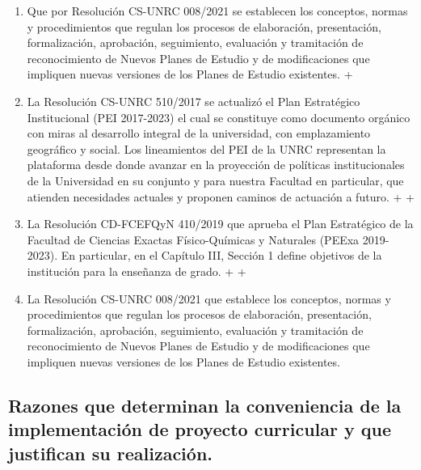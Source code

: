 \begin{enumerate}
- \item Que por Resolución CS-UNRC 008/2021 se establecen los conceptos, normas y procedimientos que regulan los procesos de elaboración, presentación, formalización, aprobación, seguimiento, evaluación y tramitación de reconocimiento de Nuevos Planes de Estudio y de modificaciones que impliquen nuevas versiones de los Planes de Estudio existentes.
+\item La Resolución CS-UNRC 510/2017 se actualizó el Plan Estratégico Institucional (PEI 2017-2023) el cual se constituye como documento orgánico con miras al desarrollo integral de la universidad, con emplazamiento geográfico y social. Los lineamientos del PEI de la UNRC representan la plataforma desde donde avanzar en la proyección de políticas institucionales de la Universidad en su conjunto y para nuestra Facultad en particular, que atienden necesidades actuales y proponen caminos de actuación a futuro.
+
+\item La Resolución CD-FCEFQyN 410/2019 que aprueba el Plan Estratégico de la Facultad de Ciencias Exactas Físico-Químicas y Naturales (PEExa 2019-2023). En particular, en el Capítulo III, Sección 1 define objetivos de la institución para la enseñanza de grado.   
+
+ \item La Resolución CS-UNRC 008/2021 que establece los conceptos, normas y procedimientos que regulan los procesos de elaboración, presentación, formalización, aprobación, seguimiento, evaluación y tramitación de reconocimiento de Nuevos Planes de Estudio y de modificaciones que impliquen nuevas versiones de los Planes de Estudio existentes.
 
 \end{enumerate}
 
 \subsection{Razones que determinan la conveniencia de la implementación de proyecto curricular  y que justifican su realización.}
 
